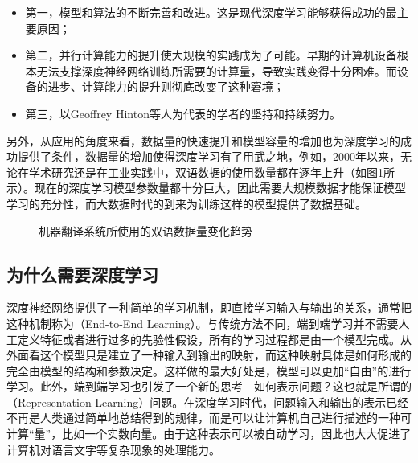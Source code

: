 \begin{itemize}
\vspace{0.5em}
\item 第一，模型和算法的不断完善和改进。这是现代深度学习能够获得成功的最主要原因；
\vspace{0.5em}
\item 第二，并行计算能力的提升使大规模的实践成为了可能。早期的计算机设备根本无法支撑深度神经网络训练所需要的计算量，导致实践变得十分困难。而设备的进步、计算能力的提升则彻底改变了这种窘境；
\vspace{0.5em}
\item 第三，以Geoffrey Hinton等人为代表的学者的坚持和持续努力。
\vspace{0.5em}
\end{itemize}

\parinterval 另外，从应用的角度来看，数据量的快速提升和模型容量的增加也为深度学习的成功提供了条件，数据量的增加使得深度学习有了用武之地，例如，2000年以来，无论在学术研究还是在工业实践中，双语数据的使用数量都在逐年上升（如图\ref{fig:9-1}所示）。现在的深度学习模型参数量都十分巨大，因此需要大规模数据才能保证模型学习的充分性，而大数据时代的到来为训练这样的模型提供了数据基础。

\begin{figure}[htp]
\centering
 
\caption{机器翻译系统所使用的双语数据量变化趋势}
\label{fig:9-1}
\end{figure}


\subsection{为什么需要深度学习}

\parinterval 深度神经网络提供了一种简单的学习机制，即直接学习输入与输出的关系，通常把这种机制称为{\small{}}（End-to-End Learning）。与传统方法不同，端到端学习并不需要人工定义特征或者进行过多的先验性假设，所有的学习过程都是由一个模型完成。从外面看这个模型只是建立了一种输入到输出的映射，而这种映射具体是如何形成的完全由模型的结构和参数决定。这样做的最大好处是，模型可以更加“自由”的进行学习。此外，端到端学习也引发了一个新的思考\ \dash \ 如何表示问题？这也就是所谓的{\small{}}（Representation Learning）问题。在深度学习时代，问题输入和输出的表示已经不再是人类通过简单地总结得到的规律，而是可以让计算机自己进行描述的一种可计算“量”，比如一个实数向量。由于这种表示可以被自动学习，因此也大大促进了计算机对语言文字等复杂现象的处理能力。

